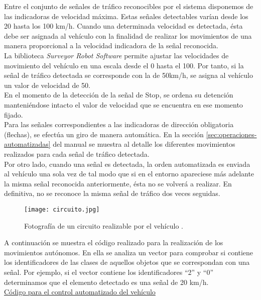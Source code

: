 Entre el conjunto de señales de tráfico reconocibles por el sistema disponemos de las indicadoras de velocidad máxima. Estas señales detectables varían desde los 20 hasta los 100 km/h. Cuando una determinada velocidad es detectada, ésta debe ser asignada al vehículo con la finalidad de realizar los movimientos de una manera proporcional a la velocidad indicadora de la señal reconocida. \\

La biblioteca \emph{Surveyor Robot Software} permite ajustar las velocidades de movimiento del vehículo en una escala desde el 0 hasta el 100. Por tanto, si la señal de tráfico detectada se corresponde con la de 50km/h, se asigna al vehículo un valor de velocidad de 50.\\

En el momento de la detección de la señal de Stop, se ordena su detención manteniéndose intacto el valor de velocidad que se encuentra en ese momento fijado.\\

Para las señales correspondientes a las indicadoras de dirección obligatoria (flechas), se efectúa un giro de manera automática. En la sección \ref{sec:operaciones-automatizadas} del manual se muestra al detalle los diferentes movimientos realizados para cada señal de tráfico detectada.\\

Por otro lado, cuando una señal es detectada, la orden automatizada es enviada al vehículo una sola vez de tal modo que si en el entorno apareciese más adelante la misma señal reconocida anteriormente, ésta no se volverá a realizar. En definitiva, no se reconoce la misma señal de tráfico dos veces seguidas. \\

\begin{figure}[H]
  \begin{center}
    \texttt{[image: circuito.jpg]}
  \end{center}
  \caption{Fotografía de un circuito realizable por el vehículo .}
  \label{fig:circuito}
\end{figure}


A continuación se muestra el código realizado para la realización de los movimientos autónomos. En ella se analiza un vector para comprobar si contiene los identificadores de las clases de aquellos objetos que se correspondan con una señal. Por ejemplo, si el vector contiene los identificadores ``2'' y ``0'' determinamos que el elemento detectado es una señal de 20 km/h.\\

\underline{Código para el control automatizado del vehículo}









